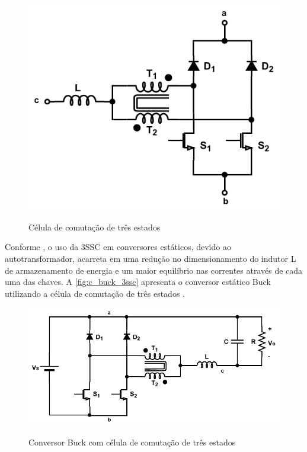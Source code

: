             \begin{figure}[H]
            	\centering
            	\caption{Célula de comutação de três estados}
            	\includegraphics[scale=1]{pdf/interleaved/celula_3ssc_2.pdf}
            	\label{fig:cell_3ssc}
            \end{figure}
            
            Conforme , o uso da 3SSC em conversores estáticos, devido ao autotransformador, acarreta em uma redução no dimensionamento do indutor L de armazenamento de energia e um maior equilíbrio nas correntes através de cada uma das chaves. A \autoref{fig:c_buck_3ssc} apresenta o conversor estático Buck utilizando a célula de comutação de três estados \cite{ref:BI_artigo_Falcondes}. 
            
            \begin{figure}[H]
            	\centering
            	\caption{Conversor Buck com célula de comutação de três estados}
            	\includegraphics[scale=1]{pdf/interleaved/conversor_3SSC_2.pdf}
            	\label{fig:c_buck_3ssc}
            \end{figure}
            
